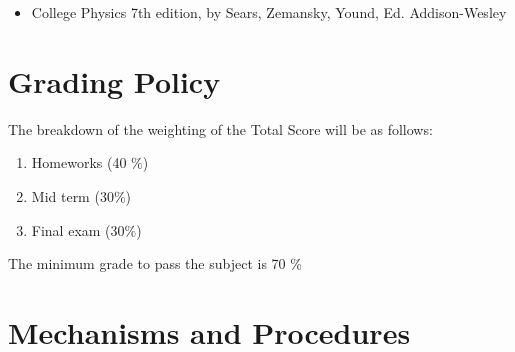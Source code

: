 \documentclass[12pt]{article}
\begin{document}
\begin{itemize}
\item 
	College Physics 7th edition, by Sears, Zemansky, Yound, Ed.
	Addison-Wesley
\end{itemize}


\section*{Grading Policy}

The breakdown of the weighting of the Total Score will be as follows:

\begin{enumerate}
\item  	Homeworks (40 $\%$)
\item   Mid term (30$\%$)
\item 	Final exam (30$\%$)

\end{enumerate}

The minimum grade to pass the subject is 70 \% 


\section*{Mechanisms and Procedures}
\end{document}
